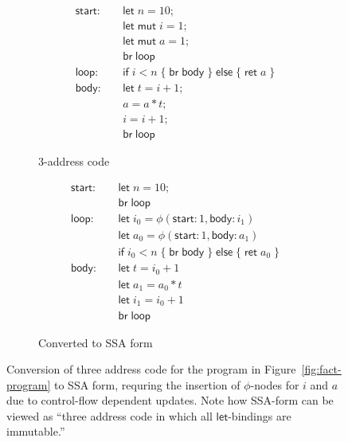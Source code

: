 \documentclass[acmsmall,screen,review]{acmart}
\newcounter{todos}
\newcommand{\todo}[1]{\stepcounter{todos} \textcolor{red}{\textbf{TODO \arabic{todos}}: #1}}
\newcommand{\ms}[1]{\ensuremath{\mathsf{#1}}}
\begin{document}
\begin{figure}
  \begin{subfigure}[t]{.5\textwidth}
    \begin{align*}
      \ms{start}:\quad  & \ms{let}\;n = 10; \\
                        & \ms{let\;mut}\;i = 1; \\
                        & \ms{let\;mut}\;a = 1; \\
                        & \ms{br}\;\ms{loop} \\
      \ms{loop}: \quad  & \ms{if}\;i < n\;
                          \{\;\ms{br}\;\ms{body}\;\}\;
                          \ms{else}\;\{\;\ms{ret}\;a\;\} \\
      \ms{body}: \quad  & \ms{let}\;t = i + 1; \\
                        & a = a * t; \\
                        & i = i + 1; \\
                        & \ms{br}\;\ms{loop}
    \end{align*}
    \caption{3-address code}
  \end{subfigure}%
  \begin{subfigure}[t]{.5\textwidth}
    \begin{align*}
      \ms{start}:\quad & \ms{let}\;n = 10; \\
      & \ms{br}\;\ms{loop} \\
      \ms{loop}: \quad  & \ms{let}\;i_0 = \phi(\ms{start}: 1, \ms{body}: i_1) \\
                        & \ms{let}\;a_0 = \phi(\ms{start}: 1, \ms{body}: a_1) \\
                        & \ms{if}\;i_0 < n\;
                          \{\;\ms{br}\;\ms{body}\;\}\;
                          \ms{else}\;\{\;\ms{ret}\;a_0\;\} \\
      \ms{body}: \quad  & \ms{let}\;t = i_0 + 1 \\
                        & \ms{let}\;a_1 = a_0 * t \\
                        & \ms{let}\;i_1 = i_0 + 1 \\
                        & \ms{br}\;\ms{loop}
    \end{align*}
    \caption{Converted to SSA form}
    \label{fig:fact-ssa}
  \end{subfigure}
  \caption{
    Conversion of three address code for the program in Figure~\ref{fig:fact-program} to SSA 
    form, requring the insertion of $\phi$-nodes for $i$ and $a$ due to control-flow dependent
    updates. Note how SSA-form can be viewed as ``three address code in which all 
    \ms{let}-bindings are immutable.''
  }
  \Description{}
\end{figure}
 
\end{document}
